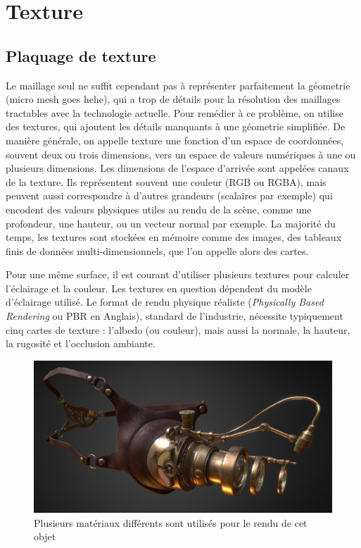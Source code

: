 \section{Texture}

\subsection*{Plaquage de texture}

Le maillage seul ne suffit cependant pas à représenter parfaitement la géometrie (micro mesh goes hehe), qui a trop de détails pour la résolution des maillages tractables avec la technologie actuelle. Pour remédier à ce problème, on utilise des textures, qui ajoutent les détails manquants à une géometrie simplifiée. De manière générale, on appelle texture une fonction d'un espace de coordonnées, souvent deux ou trois dimensions, vers un espace de valeurs numériques à une ou plusieurs dimensions. Les dimensions de l'espace d'arrivée sont appelées canaux de la texture. Ils représentent souvent une couleur (RGB ou RGBA), mais peuvent aussi correspondre à d'autres grandeurs (scalaires par exemple) qui encodent des valeurs physiques utiles au rendu de la scène, comme une profondeur, une hauteur, ou un vecteur normal par exemple. La majorité du temps, les textures sont stockées en mémoire comme des images, des tableaux finis de données multi-dimensionnels, que l'on appelle alors des cartes. 

\bigskip

Pour une même surface, il est courant d'utiliser plusieurs textures pour calculer l'éclairage et la couleur. Les textures en question dépendent du modèle d'éclairage utilisé. Le format de rendu physique réaliste ({\it Physically Based Rendering} ou PBR en Anglais), standard de l'industrie, nécessite typiquement cinq cartes de texture : l'albedo (ou couleur), mais aussi la normale, la hauteur, la rugosité et l'occlusion ambiante. 

\begin{figure}
    \centering
    \includegraphics[width=.65\textwidth]{contenu/resources/images/mutli-material-object}
    \caption[Rendu d'un objet comportant plusieurs matériaux]{Plusieurs matériaux différents sont utilisés pour le rendu de cet objet~\cite{multi-material}}
    \label{fig:multi-material}
\end{figure}


